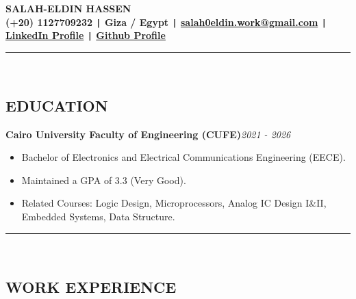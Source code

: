 \documentclass[11pt,a4paper]{article}
\begin{document}
\begin{center}
\fontsize{22}{22}\textbf{SALAH-ELDIN HASSEN}\\[0.2cm]
\fontsize{11}{12}\textbf{ (+20) 1127709232 \texttt{|} Giza / Egypt \texttt{|}  \href{mailto:salah0eldin.work@gmail.com}{salah0eldin.work@gmail.com} \texttt{{|}} \href{https://www.linkedin.com/in/salah-eldin-hassen-5bba10250/}{LinkedIn Profile} \texttt{{|}} \href{https://github.com/salah0eldin}{Github Profile}}\\[-0.1cm]
\rule{\textwidth}{0.3pt}\\
\end{center}
\vspace{-0.9cm}
\begin{center}
\section*{\fontsize{14}{18}\textbf\selectfont EDUCATION}
\end{center}
\vspace{-0.2cm}
\renewcommand\labelitemi{\raisebox{0.2ex}{\scriptsize$\bullet$}}
\begin{flushleft}
\textbf{Cairo University Faculty of Engineering (CUFE)}\hfill\textit{2021 - 2026}\\
\end{flushleft}
\vspace{-0.6cm}
\begin{itemize}
\item \setlength{\itemsep}{-0.0em} Bachelor of Electronics and Electrical Communications Engineering (EECE).
\item \setlength{\itemsep}{-0.0em} Maintained a GPA of 3.3 (Very Good).
\item \setlength{\itemsep}{-0.0em} Related Courses:  Logic Design, Microprocessors, Analog IC Design I\&II, Embedded Systems, Data Structure.
\end{itemize}
\vspace{-0.3cm}
\vspace{-0.2cm}
\rule{\textwidth}{0.3pt}\\
\vspace{-0.9cm}
\begin{center}
\section*{\fontsize{14}{ 18 }\textbf\selectfont WORK EXPERIENCE}
\end{center}
\vspace{-0.2cm}
\end{document}
